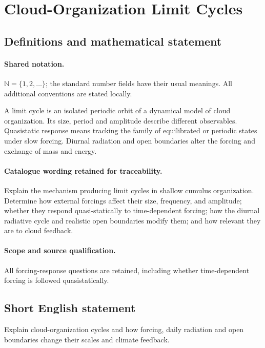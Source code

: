 \documentclass[11pt]{article}
\begin{document}
\section{Cloud-Organization Limit Cycles}\label{statement}

\subsection{Definitions and mathematical statement}

\paragraph{Shared notation.}$\mathbb N=\{1,2,\ldots\}$; the standard number fields have their usual meanings. All additional conventions are stated locally.


A limit cycle is an isolated periodic orbit of a dynamical model of cloud organization. Its size, period and amplitude describe different observables. Quasistatic response means tracking the family of equilibrated or periodic states under slow forcing. Diurnal radiation and open boundaries alter the forcing and exchange of mass and energy.

\paragraph{Catalogue wording retained for traceability.}
Explain the mechanism producing limit cycles in shallow cumulus organization. Determine how external forcings affect their size, frequency, and amplitude; whether they respond quasi-statically to time-dependent forcing; how the diurnal radiative cycle and realistic open boundaries modify them; and how relevant they are to cloud feedback.

\paragraph{Scope and source qualification.}All forcing-response questions are retained, including whether time-dependent forcing is followed quasistatically.
\subsection{Short English statement}
Explain cloud-organization cycles and how forcing, daily radiation and open boundaries change their scales and climate feedback.
\end{document}
